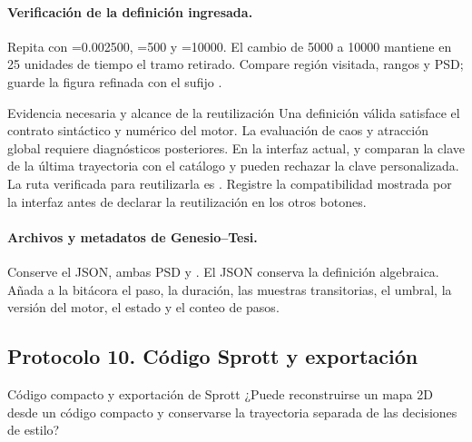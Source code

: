 
\paragraph{Verificación de la definición ingresada.}
Repita con =0.002500, =500 y
=10000. El cambio de 5000 a 10000 mantiene en 25
unidades de tiempo el tramo retirado. Compare región visitada, rangos y PSD;
guarde la figura refinada con el sufijo .

\begin{cajaalerta}{Evidencia necesaria y alcance de la reutilización}
Una definición válida satisface el contrato sintáctico y numérico del
motor. La evaluación de caos y atracción global requiere diagnósticos posteriores. En la interfaz actual,
 y  comparan la clave de la última
trayectoria con el catálogo y pueden rechazar la clave personalizada. La ruta
verificada para reutilizarla es . Registre la compatibilidad
mostrada por la interfaz antes de declarar la reutilización en los otros botones.
\end{cajaalerta}

\paragraph{Archivos y metadatos de Genesio--Tesi.}
Conserve el JSON, ambas PSD y . El JSON conserva la definición algebraica. Añada a la bitácora el paso, la duración,
las muestras transitorias, el umbral, la versión del motor, el estado y el conteo de pasos.

\subsection{Protocolo 10. Código Sprott y exportación}

\begin{cajaazul}{Código compacto y exportación de Sprott}
¿Puede reconstruirse un mapa 2D desde un código compacto y conservarse la
trayectoria separada de las decisiones de estilo?
\end{cajaazul}

